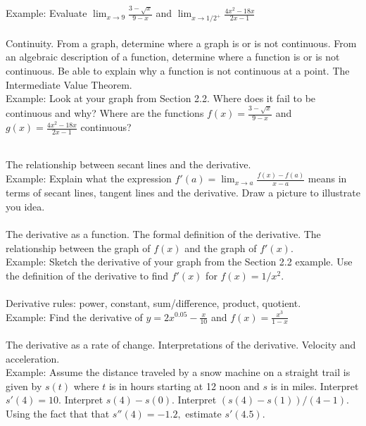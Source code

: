 \documentclass[11pt,fleqn]{article}
\begin{document}
Example: Evaluate $\lim_{x \to 9} \frac{3-\sqrt{x}}{9-x}$ and $\lim_{x \to 1/2^+} \frac{4x^2-18x}{2x-1}$\\

\noindent {}\\
Continuity. From a graph, determine where a graph is or is not continuous. From an algebraic description of a function, determine where a function is or is not continuous. Be able to explain why a function is not continuous at a point. The Intermediate Value Theorem.\\

Example: Look at your graph from Section 2.2. Where does it fail to be continuous and why? Where are the functions $f(x)= \frac{3-\sqrt{x}}{9-x}$ and $g(x)=  \frac{4x^2-18x}{2x-1}$ continuous?


\noindent {}\\
The relationship between secant lines and the derivative.\\

Example: Explain what the expression $f'(a) = \lim_{x \to a} \frac{f(x)-f(a)}{x-a}$ means in terms of secant lines, tangent lines and the derivative. Draw a picture to illustrate you idea.\\

\noindent {}\\
The derivative as a function. The formal definition of the derivative. The relationship between the graph of $f(x)$ and the graph of $f'(x).$\\

Example: Sketch the derivative of your graph from the Section 2.2 example. Use the definition of the derivative to find $f'(x)$ for $f(x)=1/x^2.$\\


\noindent {}\\
Derivative rules: power, constant, sum/difference, product, quotient.\\

Example: Find the derivative of $y=2x^{0.05}-\frac{x}{10}$ and $f(x)=\frac{x^3}{1-x}$\\

\noindent {}\\
The derivative as a rate of change. Interpretations of the derivative. Velocity and acceleration.\\

Example: Assume the distance traveled by a snow machine on a straight trail is given by $s(t)$ where $t$ is in hours starting at 12 noon and $s$ is in miles. Interpret $s'(4)=10.$ Interpret $s(4)-s(0).$ Interpret $(s(4)-s(1))/(4-1).$ Using the fact that that $s''(4)=-1.2,$ estimate $s'(4.5).$\\
\end{document}
